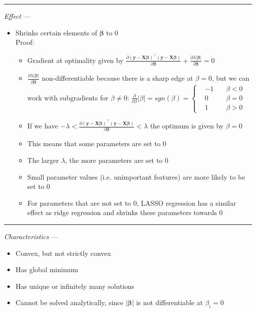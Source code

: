 {\color{lightgray}\hrule height 0.001mm}

\emph{Effect} ---
\begin{itemize}
    \item Shrinks certain elements of $\boldsymbol{\beta}$ to 0\\
    Proof:
    \begin{itemize}
        \item Gradient at optimality given by $\frac{\partial ( \boldsymbol{y} - \boldsymbol{X}\boldsymbol{\beta})^\intercal( \boldsymbol{y} - \boldsymbol{X}\boldsymbol{\beta} )}{\partial \boldsymbol{\beta}} + \frac{\partial \lambda  |\boldsymbol{\beta}|}{\partial \boldsymbol{\beta}} = 0$
        \item $\frac{\partial \lambda  |\boldsymbol{\beta}|}{\partial \boldsymbol{\beta}}$ non-differentiable because there is a sharp edge at $\beta = 0$, but we can work with subgradients for $\beta \neq 0$:
        $\frac{\partial}{\partial \beta} | \beta | = sgn(\beta) = 
        \left\{
            \begin{aligned}
                 & -1 \quad & \beta < 0 \\
                 & 0 \quad & \beta = 0 \\
                 & 1 \quad & \beta > 0   
            \end{aligned}
        \right.$
        \item If we have $-\lambda < \frac{\partial ( \boldsymbol{y} - \boldsymbol{X}\boldsymbol{\beta})^\intercal( \boldsymbol{y} - \boldsymbol{X}\boldsymbol{\beta} )}{\partial \boldsymbol{\beta}} < \lambda$ the optimum is given by $\beta = 0$
        \item This means that some parameters are set to $0$ 
        \item The larger $\lambda$, the more parameters are set to $0$
        \item Small parameter values (i.e. unimportant features) are more likely to be set to $0$
        \item For parameters that are not set to $0$, LASSO regression has a similar effect as ridge regression and shrinks these parameters towards $0$
    \end{itemize}
\end{itemize}

{\color{lightgray}\hrule height 0.001mm}

\emph{Characteristics} --- 
\begin{itemize}
    \item Convex, but not strictly convex
    \item Has global minimum
    \item Has unique or infinitely many solutions
    \item Cannot be solved analytically, since $|\boldsymbol{\beta}|$ is not differentiable at $\beta_i = 0$
\end{itemize}